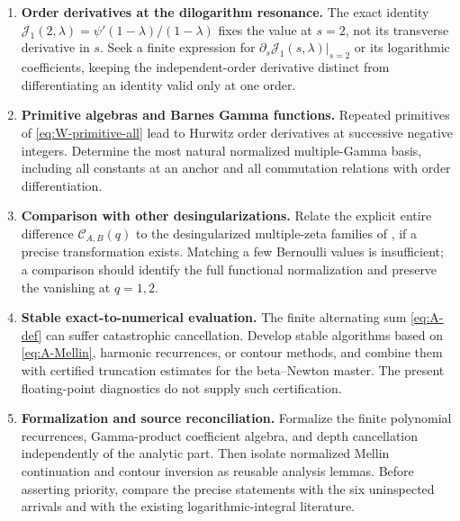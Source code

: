 \documentclass[11pt]{article}
\numberwithin{equation}{section}
\theoremstyle{definition}
\newcommand{\CC}{\mathcal C}
\newcommand{\JJ}{\mathcal J}
\begin{document}
\begin{enumerate}[label=\textbf{Q\arabic*.},leftmargin=2.8em,itemsep=7pt]
\item \textbf{Order derivatives at the dilogarithm resonance.}
The exact identity $\JJ_1(2,\lambda)=\psi'(1-\lambda)/(1-\lambda)$ fixes the value at $s=2$, not its transverse derivative in $s$. Seek a finite expression for $\partial_s\JJ_1(s,\lambda)|_{s=2}$ or its logarithmic coefficients, keeping the independent-order derivative distinct from differentiating an identity valid only at one order.

\item \textbf{Primitive algebras and Barnes Gamma functions.}
Repeated primitives of \eqref{eq:W-primitive-all} lead to Hurwitz order derivatives at successive negative integers. Determine the most natural normalized multiple-Gamma basis, including all constants at an anchor and all commutation relations with order differentiation.

\item \textbf{Comparison with other desingularizations.}
Relate the explicit entire difference $\CC_{A,B}(q)$ to the desingularized multiple-zeta families of \cite{FKMT}, if a precise transformation exists. Matching a few Bernoulli values is insufficient; a comparison should identify the full functional normalization and preserve the vanishing at $q=1,2$.

\item \textbf{Stable exact-to-numerical evaluation.}
The finite alternating sum \eqref{eq:A-def} can suffer catastrophic cancellation. Develop stable algorithms based on \eqref{eq:A-Mellin}, harmonic recurrences, or contour methods, and combine them with certified truncation estimates for the beta--Newton master. The present floating-point diagnostics do not supply such certification.

\item \textbf{Formalization and source reconciliation.}
Formalize the finite polynomial recurrences, Gamma-product coefficient algebra, and depth cancellation independently of the analytic part. Then isolate normalized Mellin continuation and contour inversion as reusable analysis lemmas. Before asserting priority, compare the precise statements with the six uninspected arrivals and with the existing logarithmic-integral literature.
\end{enumerate}
\end{document}
